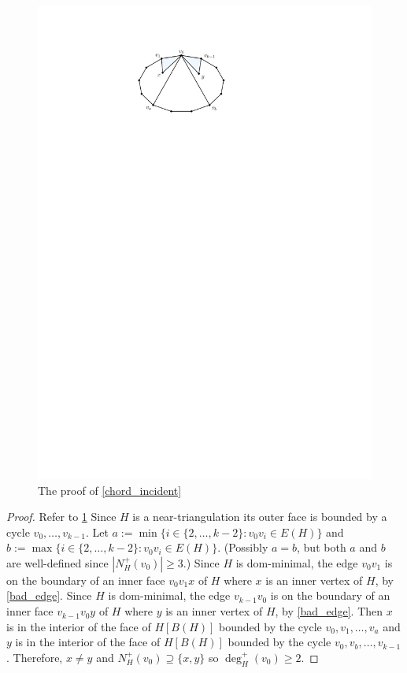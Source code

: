 \documentclass[12pt]{article}
\theoremstyle{definition}
\begin{document}
\begin{figure}[htbp]
  \centering
  \includegraphics{figs/chord_incident}
  \caption{The proof of \cref{chord_incident}}
  \label{chord_incident_fig}
\end{figure}
\begin{proof}
  Refer to \cref{chord_incident_fig}
  Since $H$ is a near-triangulation its outer face is bounded by a cycle $v_0,\ldots,v_{k-1}$.  Let $a:=\min\{i\in\{2,\ldots,k-2\}:v_0v_i\in E(H)\}$ and $b:=\max\{i\in\{2,\ldots,k-2\}:v_0v_i\in E(H)\}$. (Possibly $a=b$, but both $a$ and $b$ are well-defined since $|N^+_H(v_0)|\ge 3$.)   Since $H$ is dom-minimal, the edge $v_0v_1$ is on the boundary of an inner face $v_0v_1x$ of $H$ where $x$ is an inner vertex of $H$, by \cref{bad_edge}.  Since $H$ is dom-minimal, the edge $v_{k-1}v_0$ is on the boundary of an inner face $v_{k-1}v_0y$ of $H$ where $y$ is an inner vertex of $H$, by \cref{bad_edge}.  Then $x$ is in the interior of the face of $H[B(H)]$ bounded by the cycle $v_0,v_1,\ldots,v_a$ and $y$ is in the interior of the face of $H[B(H)]$ bounded by the cycle $v_0,v_b,\ldots,v_{k-1}$.  Therefore, $x\neq y$ and $N^+_H(v_0)\supseteq\{x,y\}$ so $\deg^+_H(v_0)\ge 2$.
\end{proof}
\end{document}
